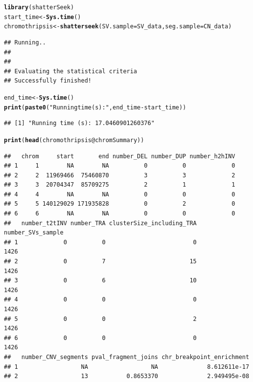 \documentclass[twoside,a4wide,11pt]{article}\usepackage[]{graphicx}\usepackage[]{color}
\makeatletter
\newcommand{\hlstr}[1]{\textcolor[rgb]{0.192,0.494,0.8}{#1}}%
\newcommand{\hlopt}[1]{\textcolor[rgb]{0,0,0}{#1}}%
\newcommand{\hlstd}[1]{\textcolor[rgb]{0.345,0.345,0.345}{#1}}%
\newcommand{\hlkwb}[1]{\textcolor[rgb]{0.69,0.353,0.396}{#1}}%
\newcommand{\hlkwc}[1]{\textcolor[rgb]{0.333,0.667,0.333}{#1}}%
\newcommand{\hlkwd}[1]{\textcolor[rgb]{0.737,0.353,0.396}{\textbf{#1}}}%
\newenvironment{kframe}{%
 \def\at@end@of@kframe{}%
 \ifinner\ifhmode%
  \def\at@end@of@kframe{\end{minipage}}%
  \begin{minipage}{\columnwidth}%
 \fi\fi%
 \def\FrameCommand##1{\hskip\@totalleftmargin \hskip-\fboxsep
 \colorbox{shadecolor}{##1}\hskip-\fboxsep
     \hskip-\linewidth \hskip-\@totalleftmargin \hskip\columnwidth}%
 \MakeFramed {\advance\hsize-\width
   \@totalleftmargin\z@ \linewidth\hsize
   \@setminipage}}%
 {\par\unskip\endMakeFramed%
 \at@end@of@kframe}
\newenvironment{knitrout}{}{} %
\makeatother
\begin{document}
\begin{knitrout}
\color{fgcolor}\begin{kframe}
\begin{alltt}
\hlkwd{library}\hlstd{(shatterSeek)}
\hlstd{start_time} \hlkwb{<-} \hlkwd{Sys.time}\hlstd{()}
\hlstd{chromothripsis} \hlkwb{<-} \hlkwd{shatterseek}\hlstd{(}\hlkwc{SV.sample}\hlstd{=SV_data,} \hlkwc{seg.sample}\hlstd{=CN_data)}
\end{alltt}
\begin{verbatim}
## Running..
## 
## 
## Evaluating the statistical criteria
## Successfully finished!
\end{verbatim}
\begin{alltt}
\hlstd{end_time} \hlkwb{<-} \hlkwd{Sys.time}\hlstd{()}
\hlkwd{print}\hlstd{(}\hlkwd{paste0}\hlstd{(}\hlstr{"Running time (s): "}\hlstd{,end_time} \hlopt{-} \hlstd{start_time))}
\end{alltt}
\begin{verbatim}
## [1] "Running time (s): 17.0460901260376"
\end{verbatim}
\begin{alltt}
\hlkwd{print}\hlstd{(}\hlkwd{head}\hlstd{(chromothripsis}\hlopt{@}\hlkwc{chromSummary}\hlstd{))}
\end{alltt}
\begin{verbatim}
##   chrom     start       end number_DEL number_DUP number_h2hINV
## 1     1        NA        NA          0          0             0
## 2     2  11969466  75460870          3          3             2
## 3     3  20704347  85709275          2          1             1
## 4     4        NA        NA          0          0             0
## 5     5 140129029 171935828          0          2             0
## 6     6        NA        NA          0          0             0
##   number_t2tINV number_TRA clusterSize_including_TRA number_SVs_sample
## 1             0          0                         0              1426
## 2             0          7                        15              1426
## 3             0          6                        10              1426
## 4             0          0                         0              1426
## 5             0          0                         2              1426
## 6             0          0                         0              1426
##   number_CNV_segments pval_fragment_joins chr_breakpoint_enrichment
## 1                  NA                  NA              8.612611e-17
## 2                  13           0.8653370              2.949495e-08

\end{verbatim}
\end{kframe}
\end{knitrout}
\end{document}
